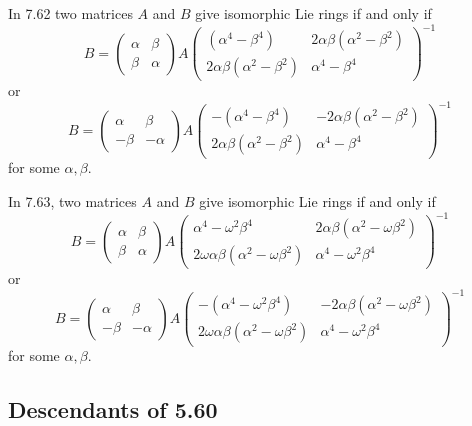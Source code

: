 \documentclass[10pt]{article}
\begin{document}
In 7.62 two matrices $A$ and $B$ give isomorphic Lie rings if and only if%
\[
B=\left( 
\begin{array}{ll}
\alpha & \beta \\ 
\beta & \alpha%
\end{array}%
\right) A\left( 
\begin{array}{ll}
(\alpha ^{4}-\beta ^{4}) & 2\alpha \beta (\alpha ^{2}-\beta ^{2}) \\ 
2\alpha \beta (\alpha ^{2}-\beta ^{2}) & \alpha ^{4}-\beta ^{4}%
\end{array}%
\right) ^{-1} 
\]%
or 
\[
B=\left( 
\begin{array}{ll}
\alpha & \beta \\ 
-\beta & -\alpha%
\end{array}%
\right) A\left( 
\begin{array}{ll}
-(\alpha ^{4}-\beta ^{4}) & -2\alpha \beta (\alpha ^{2}-\beta ^{2}) \\ 
2\alpha \beta (\alpha ^{2}-\beta ^{2}) & \alpha ^{4}-\beta ^{4}%
\end{array}%
\right) ^{-1} 
\]%
for some $\alpha ,\beta $.

In 7.63, two matrices $A$ and $B$ give isomorphic Lie rings if and only if%
\[
B=\left( 
\begin{array}{ll}
\alpha & \beta \\ 
\beta & \alpha%
\end{array}%
\right) A\left( 
\begin{array}{ll}
\alpha ^{4}-\omega ^{2}\beta ^{4} & 2\alpha \beta (\alpha ^{2}-\omega \beta
^{2}) \\ 
2\omega \alpha \beta (\alpha ^{2}-\omega \beta ^{2}) & \alpha ^{4}-\omega
^{2}\beta ^{4}%
\end{array}%
\right) ^{-1} 
\]%
or 
\[
B=\left( 
\begin{array}{ll}
\alpha & \beta \\ 
-\beta & -\alpha%
\end{array}%
\right) A\left( 
\begin{array}{ll}
-(\alpha ^{4}-\omega ^{2}\beta ^{4}) & -2\alpha \beta (\alpha ^{2}-\omega
\beta ^{2}) \\ 
2\omega \alpha \beta (\alpha ^{2}-\omega \beta ^{2}) & \alpha ^{4}-\omega
^{2}\beta ^{4}%
\end{array}%
\right) ^{-1} 
\]%
for some $\alpha ,\beta $.

\subsection{Descendants of 5.60}
\end{document}

